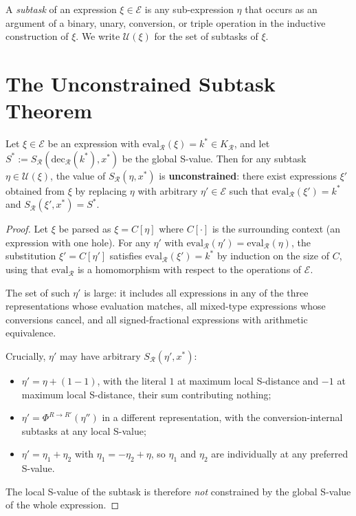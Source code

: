 \begin{definition}[Subtask]\label{def:subtask-mono}
A \emph{subtask} of an expression $\xi \in \mathcal{E}$ is any
sub-expression $\eta$ that occurs as an argument of a binary, unary,
conversion, or triple operation in the inductive construction of $\xi$.
We write $\mathcal{U}(\xi)$ for the set of subtasks of $\xi$.
\end{definition}

\section{The Unconstrained Subtask Theorem}
\label{sec:ch14-subtask}

\begin{theorem}\label{thm:unconstrained-mono}
Let $\xi \in \mathcal{E}$ be an expression with
$\mathrm{eval}_{\mathcal{R}}(\xi) = k^{*} \in K_{\mathcal{R}}$, and let
$S^{*} := S_{\mathcal{R}}(\mathrm{dec}_{\mathcal{R}}(k^{*}), x^{*})$
be the global S-value.  Then for any subtask $\eta \in \mathcal{U}(\xi)$,
the value of $S_{\mathcal{R}}(\eta, x^{*})$ is \textbf{unconstrained}: there
exist expressions $\xi'$ obtained from $\xi$ by replacing $\eta$ with arbitrary
$\eta' \in \mathcal{E}$ such that
$\mathrm{eval}_{\mathcal{R}}(\xi') = k^{*}$ and
$S_{\mathcal{R}}(\xi', x^{*}) = S^{*}$.
\end{theorem}

\begin{proof}
Let $\xi$ be parsed as $\xi = C[\eta]$ where $C[\cdot]$ is the surrounding
context (an expression with one hole).  For any $\eta'$ with
$\mathrm{eval}_{\mathcal{R}}(\eta') = \mathrm{eval}_{\mathcal{R}}(\eta)$,
the substitution $\xi' = C[\eta']$ satisfies
$\mathrm{eval}_{\mathcal{R}}(\xi') = k^{*}$ by induction on the size of $C$,
using that $\mathrm{eval}_{\mathcal{R}}$ is a homomorphism with respect to
the operations of $\mathcal{E}$.

The set of such $\eta'$ is large: it includes all expressions in any of the
three representations whose evaluation matches, all mixed-type expressions
whose conversions cancel, and all signed-fractional expressions with arithmetic
equivalence.

Crucially, $\eta'$ may have arbitrary $S_{\mathcal{R}}(\eta', x^{*})$:
\begin{itemize}[noitemsep]
  \item $\eta' = \eta + (1 - 1)$, with the literal $1$ at maximum local
    S-distance and $-1$ at maximum local S-distance, their sum contributing
    nothing;
  \item $\eta' = \Phi^{R \to R'}(\eta'')$ in a different representation, with
    the conversion-internal subtasks at any local S-value;
  \item $\eta' = \eta_1 + \eta_2$ with $\eta_1 = -\eta_2 + \eta$, so $\eta_1$
    and $\eta_2$ are individually at any preferred S-value.
\end{itemize}
The local S-value of the subtask is therefore \emph{not} constrained by the
global S-value of the whole expression.
\end{proof}

